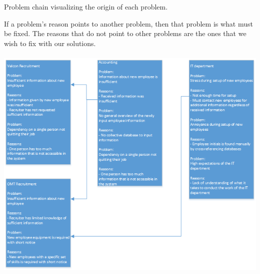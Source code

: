 \label{app:ProblemChain}

Problem chain visualizing the origin of each problem.

If a problem's reason points to another problem, then that problem is what must be fixed.
The reasons that do not point to other problems are the ones that we wish to fix with our solutions.
\\\\

\includegraphics[scale=0.75]{appendix/ProblemChain.png}